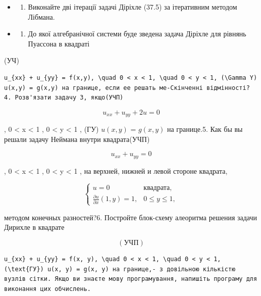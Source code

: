 \documentclass[
  ukrainian,
]{article}
\providecommand{\tightlist}{%
  \setlength{\itemsep}{0pt}\setlength{\parskip}{0pt}}
\begin{document}
\begin{itemize}
\tightlist
\item
  \begin{enumerate}
  \def\labelenumi{\arabic{enumi}.}
  \setcounter{enumi}{1}
  \tightlist
  \item
    Виконайте дві ітерації задачі Діріхле (37.5) за ітеративним методом
    Лібмана.
  \end{enumerate}
\item
  \begin{enumerate}
  \def\labelenumi{\arabic{enumi}.}
  \setcounter{enumi}{2}
  \tightlist
  \item
    До якої алгебранічної системи буде зведена задача Діріхле для
    рівнянь Пуассона в квадраті
  \end{enumerate}
\end{itemize}

(УЧ\Pi)

\begin{verbatim}
u_{xx} + u_{yy} = f(x,y), \quad 0 < x < 1, \quad 0 < y < 1, (\Gamma Y) u(x,y) = g(x,y) на границе, если ее решать ме-Скінченні відмінності? 4. Розв'язати задачу 3, якщо(УЧП)
\end{verbatim}

\[
u_{xx} + u_{yy} + 2u = 0
\]

, 0 \textless{} x \textless{} 1 , 0 \textless{} y \textless{} 1 , (ГУ)
\(u(x, y)\) = \(g(x, y)\) на границе.5. Как бы вы решали задачу Неймана
внутри квадрата(УЧП)

\[
u_{xx} + u_{yy} = 0
\]

, 0 \textless{} x \textless{} 1 , 0 \textless{} y \textless{} 1 , на
верхней, нижней и левой стороне квадрата,

\[
\begin{cases} u = 0 & \text{квадрата,} \\ \frac{\partial u}{\partial x}(1, y) = 1, & 0 \leqslant y \leqslant 1, \end{cases}
\]

методом конечных разностей?6. Постройте блок-схему алеоритма решения
задачи Дирихле в квадрате

\[
(\text{УЧП})
\]

\begin{verbatim}
u_{xx} + u_{yy} = f(x, y), \quad 0 < x < 1, \quad 0 < y < 1, (\text{ГУ}) u(x, y) = g(x, y) на границе,- з довільною кількістю вузлів сітки. Якщо ви знаєте мову програмування, напишіть програму для виконання цих обчислень.
\end{verbatim}
\end{document}
